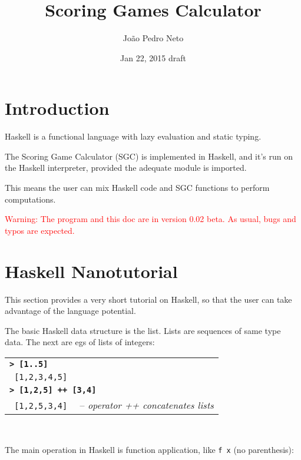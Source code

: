\documentclass[a4paper,12pt]{article}
\newcommand{\bash}[1]{\small\textbf{\lstinline§> #1§}\\}
\newcommand{\out}[1]{\small\lstinline§ #1§}
\newcommand{\hsklcmt}[1]{~~-- \footnotesize\textit{#1}}
\newcommand{\haskellCode}{\fontfamily{pcr}\selectfont}
\newenvironment{sgcode}
	{ \haskellCode
	  \begin{tabular}{|p{0.9\textwidth}|}
      \hline	
	}
	{ \\\hline  
      \end{tabular} \\
	  \par 
	}
\begin{document}
\title{Scoring Games Calculator}
\author{Jo\~{a}o Pedro Neto}
\date{Jan 22, 2015 draft}
\maketitle

\newpage
%
%

\tableofcontents

\newpage \section*{Introduction}

Haskell is a functional language with lazy evaluation and static typing.

The Scoring Game Calculator (SGC) is implemented in Haskell, and it's run on 
the Haskell interpreter, provided the adequate module is imported. 

This means the user can mix Haskell code and SGC functions to perform computations.

\textcolor{red}{Warning: The program and this doc are in version 0.02 beta. As usual, bugs and typos are expected.}

\section{Haskell Nanotutorial}

This section provides a very short tutorial on Haskell, so that the user can
take advantage of the language potential.

The basic Haskell data structure is the list. Lists are sequences of
same type data. The next are egs of lists of integers:

\begin{sgcode}
\bash{[1..5]}
\out{[1,2,3,4,5]} \\
\bash{[1,2,5] ++ [3,4]} 
\out{[1,2,5,3,4]} \hsklcmt{operator ++ concatenates lists}
\end{sgcode}

The main operation in Haskell is function application, like \verb|f x| (no parenthesis):
\end{document}
